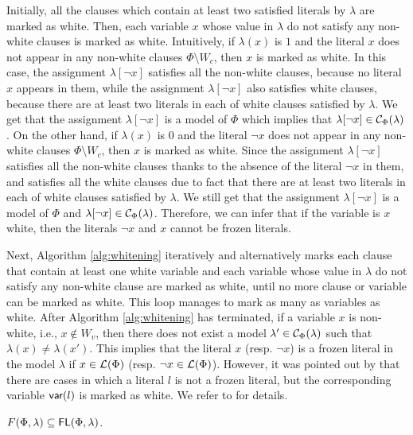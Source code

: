 Initially, all the clauses which contain at least two satisfied literals by $\lambda$ are marked as white.
Then, each variable $x$ whose value in $\lambda$ do not satisfy any non-white clauses is marked as white.
Intuitively, if $\lambda(x)$ is $1$ and the literal $x$ does not appear in any non-white clauses $\Phi\setminus W_c$, then $x$ is marked as white. In this case, 
the assignment $\lambda[\neg x]$ satisfies all the non-white clauses, because no literal
$x$ appears in them, while the assignment $\lambda[\neg x]$ also satisfies white clauses, because there are at least two literals in each of white clauses
satisfied by $\lambda$. We get that the assignment $\lambda[\neg x]$ is a model of $\Phi$ which implies that $\lambda[\neg x]\in \mathcal{C}_\Phi(\lambda)$. 
On the other hand, if $\lambda(x)$ is $0$ and the literal $\neg x$ does not appear in any non-white clauses $\Phi\setminus W_c$, then $x$ is marked as white.
Since the assignment $\lambda[\neg x]$ satisfies all the non-white clauses thanks to the absence of the literal
$\neg x$ in them, and satisfies all the white clauses due to fact that there are at least two literals in each of white clauses satisfied by $\lambda$.
We still get that the assignment $\lambda[\neg x]$ is a model of $\Phi$ and $\lambda[\neg x]\in \mathcal{C}_\Phi(\lambda)$. 
Therefore, we can infer that if the variable is $x$ white, then the literals $\neg x$ and $x$ cannot be frozen literals.

Next, Algorithm \ref{alg:whitening} iteratively and alternatively marks each clause that contain at least one white variable and each variable whose value in $\lambda$ do not satisfy any non-white clause are marked as white, until no more clause or variable can be marked as white. 
This loop manages to mark as many as variables as white. 
After Algorithm \ref{alg:whitening} has terminated, if a variable $x$ is non-white, i.e., $x\not\in W_v$, then there does not exist a model $\lambda'\in \mathcal{C}_\Phi(\lambda)$ such that $\lambda(x)\neq \lambda(x')$. This implies that the literal $x$ (resp. $\neg x$) is a frozen literal
in the model $\lambda$ if $x\in {\cal L}(\Phi)$ (resp. $\neg x\in {\cal L}(\Phi)$).  However, it was pointed out by \cite{LMZ09} that there are cases in which
a literal $l$ is not a frozen literal, but the corresponding variable $\textsf{var}(l)$ is marked as white. We refer to \cite{LMZ09} for details.



\begin{theorem}\cite{LMZ09}
\label{thm:whiten}
$F(\Phi,\lambda)\subseteq\textsf{FL}(\Phi,\lambda)$.
\end{theorem}


